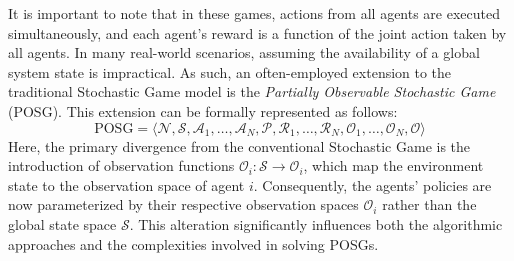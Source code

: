 It is important to note that in these games, actions from all agents are executed simultaneously, 
 and each agent's reward is a function of the joint action taken by all agents. 
 In many real-world scenarios, assuming the availability of a global system state is impractical. 
 As such, an often-employed extension to the traditional Stochastic Game model is the \emph{Partially Observable Stochastic Game} (POSG). This extension can be formally represented as follows:
\begin{equation}
\text{POSG} = \langle \mathcal{N}, \mathcal{S}, \mathcal{A}_1, \ldots, \mathcal{A}_N, \mathcal{P}, \mathcal{R}_1, \ldots, \mathcal{R}_N, \mathcal{O}_1, \ldots, \mathcal{O}_N, \mathcal{O} \rangle
\end{equation}
Here, 
 the primary divergence from the conventional Stochastic Game 
 is the introduction of observation functions \(\mathcal{O}_i: \mathcal{S} \rightarrow \mathcal{O}_i\), 
 which map the environment state to the observation space of agent \(i\). 
 Consequently, the agents' policies are now parameterized by their respective observation spaces \(\mathcal{O}_i\) rather than the global state space \(\mathcal{S}\). 
 This alteration significantly influences both the algorithmic approaches and the complexities involved in solving POSGs.
